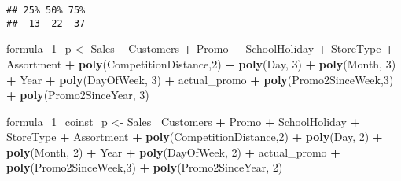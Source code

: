 \documentclass[]{article}
\newenvironment{Shaded}{\begin{snugshade}}{\end{snugshade}}
\newcommand{\DecValTok}[1]{\textcolor[rgb]{0.00,0.00,0.81}{#1}}
\newcommand{\KeywordTok}[1]{\textcolor[rgb]{0.13,0.29,0.53}{\textbf{#1}}}
\newcommand{\NormalTok}[1]{#1}
\newcommand{\OperatorTok}[1]{\textcolor[rgb]{0.81,0.36,0.00}{\textbf{#1}}}
\newcommand{\StringTok}[1]{\textcolor[rgb]{0.31,0.60,0.02}{#1}}
\begin{document}
\begin{verbatim}
## 25% 50% 75% 
##  13  22  37
\end{verbatim}

\begin{Shaded}
\begin{Highlighting}[]
\NormalTok{formula_}\DecValTok{1}\NormalTok{_p <-}\StringTok{ }\NormalTok{Sales }\OperatorTok{~}\StringTok{ }\NormalTok{Customers }\OperatorTok{+}\StringTok{ }\NormalTok{Promo }\OperatorTok{+}\StringTok{ }\NormalTok{SchoolHoliday }\OperatorTok{+}\StringTok{ }\NormalTok{StoreType }\OperatorTok{+}\StringTok{ }\NormalTok{Assortment }\OperatorTok{+}\StringTok{ }\KeywordTok{poly}\NormalTok{(CompetitionDistance,}\DecValTok{2}\NormalTok{) }\OperatorTok{+}\StringTok{ }\KeywordTok{poly}\NormalTok{(Day, }\DecValTok{3}\NormalTok{) }\OperatorTok{+}\StringTok{ }\KeywordTok{poly}\NormalTok{(Month, }\DecValTok{3}\NormalTok{) }\OperatorTok{+}\StringTok{ }\NormalTok{Year }\OperatorTok{+}\StringTok{ }\KeywordTok{poly}\NormalTok{(DayOfWeek, }\DecValTok{3}\NormalTok{) }\OperatorTok{+}\StringTok{ }\NormalTok{actual_promo }\OperatorTok{+}\StringTok{ }\KeywordTok{poly}\NormalTok{(Promo2SinceWeek,}\DecValTok{3}\NormalTok{) }\OperatorTok{+}\StringTok{ }\KeywordTok{poly}\NormalTok{(Promo2SinceYear, }\DecValTok{3}\NormalTok{)}

\NormalTok{formula_}\DecValTok{1}\NormalTok{_coinst_p <-}\StringTok{ }\NormalTok{Sales}\OperatorTok{~}\StringTok{ }\NormalTok{Customers }\OperatorTok{+}\StringTok{ }\NormalTok{Promo }\OperatorTok{+}\StringTok{ }\NormalTok{SchoolHoliday }\OperatorTok{+}\StringTok{ }\NormalTok{StoreType }\OperatorTok{+}\StringTok{ }\NormalTok{Assortment }\OperatorTok{+}\StringTok{ }\KeywordTok{poly}\NormalTok{(CompetitionDistance,}\DecValTok{2}\NormalTok{) }\OperatorTok{+}\StringTok{ }\KeywordTok{poly}\NormalTok{(Day, }\DecValTok{2}\NormalTok{) }\OperatorTok{+}\StringTok{ }\KeywordTok{poly}\NormalTok{(Month, }\DecValTok{2}\NormalTok{) }\OperatorTok{+}\StringTok{ }\NormalTok{Year }\OperatorTok{+}\StringTok{ }\KeywordTok{poly}\NormalTok{(DayOfWeek, }\DecValTok{2}\NormalTok{) }\OperatorTok{+}\StringTok{ }\NormalTok{actual_promo }\OperatorTok{+}\StringTok{ }\KeywordTok{poly}\NormalTok{(Promo2SinceWeek,}\DecValTok{3}\NormalTok{) }\OperatorTok{+}\StringTok{ }\KeywordTok{poly}\NormalTok{(Promo2SinceYear, }\DecValTok{2}\NormalTok{)}


\end{Highlighting}
\end{Shaded}
\end{document}
